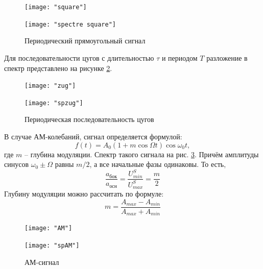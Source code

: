 \documentclass[a4paper]{article}
\begin{document}
\begin{figure}[h]
	\begin{minipage}{0.49\linewidth}
		\centering
		\texttt{[image: "square"]}
		\label{fig:spectr}
	\end{minipage}
	\begin{minipage}{0.49\linewidth}
		\centering
		\texttt{[image: "spectre square"]}
	\end{minipage}
	\caption{Периодический прямоугольный сигнал}
	\label{fig:sq}
\end{figure}

Для последовательности цугов с длительностью $ \tau  $ и периодом $ T $ разложение в спектр представлено на рисунке \ref{fig:zug}.

\begin{figure}[h]
	\begin{minipage}{0.49\linewidth}
		\centering
		\texttt{[image: "zug"]}
	\end{minipage}
	\begin{minipage}{0.49\linewidth}
		\centering
		\texttt{[image: "spzug"]}
	\end{minipage}
	\caption{Периодическая последовательность цугов}
	\label{fig:zug}
\end{figure}

В случае АМ-колебаний, сигнал определяется формулой:
\begin{equation}\label{key}
	f(t) = A_0 \left(1+m \cos \Omega t \right) \cos \omega_0 t,
\end{equation}
где $ m $ -- глубина модуляции.
Спектр такого сигнала на рис. \ref{fig:AM}. Причём амплитуды синусов $ \omega_0 \pm \Omega $ равны $ m/2 $, а все начальные фазы одинаковы. То есть,
\begin{equation}\label{new}
	\frac{a_{бок}}{a_{осн}} = \frac{U_{min}^S}{U_{max}^S} = \frac{m}{2}
\end{equation} Глубину модуляции можно рассчитать по формуле:
\begin{equation}\label{m}
	m = \frac{A_{max}-A_{min}}{A_{max}+A_{min}}
\end{equation}
\begin{figure}[h]
	\begin{minipage}{0.49\linewidth}
		\centering
		\texttt{[image: "AM"]}
	\end{minipage}
	\begin{minipage}{0.49\linewidth}
		\centering
		\texttt{[image: "spAM"]}
	\end{minipage}
	\caption{АМ-сигнал}
	\label{fig:AM}
\end{figure}
\end{document}
